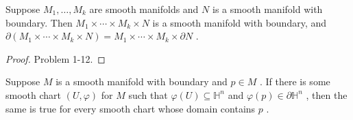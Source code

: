 \begin{proposition}
\label{prop:1-45}
\mathlibok
{}
Suppose ${M}_{1},\ldots ,{M}_{k}$ are smooth manifolds and $N$ is a smooth manifold with boundary. Then ${M}_{1} \times  \cdots  \times  {M}_{k} \times  N$ is a smooth manifold with boundary, and $\partial \left( {{M}_{1} \times  \cdots  \times  {M}_{k} \times  N}\right)  = {M}_{1} \times  \cdots  \times  {M}_{k} \times  \partial N$ .
\end{proposition}

\begin{proof}
Problem 1-12.
\end{proof}

\begin{theorem}
\label{thm:1-46}
\leanok
{}
Suppose $M$ is a smooth manifold with boundary and $p \in  M$ . If there is some smooth chart $\left( {U,\varphi }\right)$ for $M$ such that $\varphi \left( U\right)  \subseteq  {\mathbb{H}}^{n}$ and $\varphi \left( p\right)  \in  \partial {\mathbb{H}}^{n}$ , then the same is true for every smooth chart whose domain contains $p$ .
\end{theorem}

